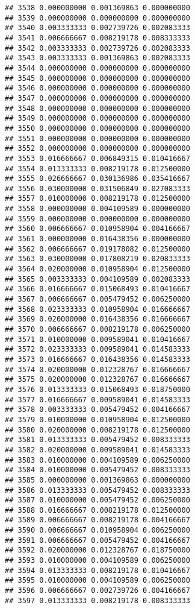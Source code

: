 \documentclass[
]{article}
\begin{document}
\begin{verbatim}
## 3538 0.000000000 0.001369863 0.000000000
## 3539 0.000000000 0.000000000 0.000000000
## 3540 0.003333333 0.002739726 0.002083333
## 3541 0.006666667 0.008219178 0.008333333
## 3542 0.003333333 0.002739726 0.002083333
## 3543 0.003333333 0.001369863 0.002083333
## 3544 0.000000000 0.000000000 0.000000000
## 3545 0.000000000 0.000000000 0.000000000
## 3546 0.000000000 0.000000000 0.000000000
## 3547 0.000000000 0.000000000 0.000000000
## 3548 0.000000000 0.000000000 0.000000000
## 3549 0.000000000 0.000000000 0.000000000
## 3550 0.000000000 0.000000000 0.000000000
## 3551 0.000000000 0.000000000 0.000000000
## 3552 0.000000000 0.000000000 0.000000000
## 3553 0.016666667 0.006849315 0.010416667
## 3554 0.013333333 0.008219178 0.012500000
## 3555 0.026666667 0.030136986 0.035416667
## 3556 0.030000000 0.031506849 0.027083333
## 3557 0.010000000 0.008219178 0.012500000
## 3558 0.000000000 0.004109589 0.000000000
## 3559 0.000000000 0.000000000 0.000000000
## 3560 0.006666667 0.010958904 0.004166667
## 3561 0.000000000 0.016438356 0.000000000
## 3562 0.006666667 0.019178082 0.012500000
## 3563 0.030000000 0.017808219 0.020833333
## 3564 0.020000000 0.010958904 0.012500000
## 3565 0.003333333 0.004109589 0.002083333
## 3566 0.016666667 0.015068493 0.010416667
## 3567 0.006666667 0.005479452 0.006250000
## 3568 0.023333333 0.010958904 0.016666667
## 3569 0.020000000 0.016438356 0.016666667
## 3570 0.006666667 0.008219178 0.006250000
## 3571 0.010000000 0.009589041 0.010416667
## 3572 0.023333333 0.009589041 0.014583333
## 3573 0.016666667 0.016438356 0.014583333
## 3574 0.020000000 0.012328767 0.016666667
## 3575 0.020000000 0.012328767 0.016666667
## 3576 0.013333333 0.015068493 0.018750000
## 3577 0.016666667 0.009589041 0.014583333
## 3578 0.003333333 0.005479452 0.004166667
## 3579 0.010000000 0.010958904 0.012500000
## 3580 0.020000000 0.008219178 0.012500000
## 3581 0.013333333 0.005479452 0.008333333
## 3582 0.020000000 0.009589041 0.014583333
## 3583 0.010000000 0.004109589 0.006250000
## 3584 0.010000000 0.005479452 0.008333333
## 3585 0.000000000 0.001369863 0.000000000
## 3586 0.013333333 0.005479452 0.008333333
## 3587 0.010000000 0.005479452 0.006250000
## 3588 0.016666667 0.008219178 0.012500000
## 3589 0.006666667 0.008219178 0.004166667
## 3590 0.006666667 0.010958904 0.006250000
## 3591 0.006666667 0.005479452 0.004166667
## 3592 0.020000000 0.012328767 0.018750000
## 3593 0.010000000 0.004109589 0.006250000
## 3594 0.013333333 0.008219178 0.010416667
## 3595 0.010000000 0.004109589 0.006250000
## 3596 0.006666667 0.002739726 0.004166667
## 3597 0.013333333 0.008219178 0.008333333

\end{verbatim}
\end{document}
